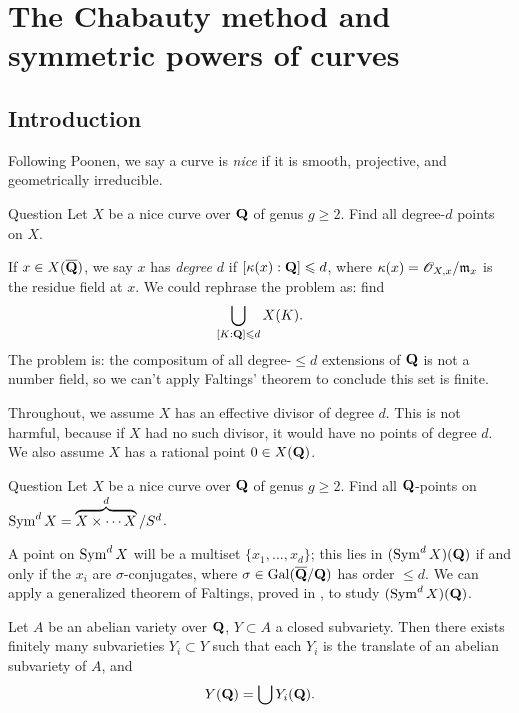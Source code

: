 
\section{The Chabauty method and symmetric powers of curves}





\subsection{Introduction}

Following Poonen, we say a curve is \emph{nice} if it is smooth, projective, 
and geometrically irreducible. 

\begin{enonce}{Question}
Let $X$ be a nice curve over $\mathbf{Q}$ of genus $g\geqslant 2$. Find all degree-$d$ 
points on $X$. 
\end{enonce}

If $x\in X(\overline{\mathbf{Q}})$, we say $x$ has \emph{degree $d$} if 
$[\kappa(x):\mathbf{Q}]\leqslant d$, where $\kappa(x)=\mathscr{O}_{X,x}/\mathfrak{m}_x$ is the residue 
field at $x$. We could rephrase the problem as: find 
\[
  \bigcup_{[K:\mathbf{Q}]\leqslant d} X(K) .
\]
The problem is: the compositum of all degree-$\leqslant d$ extensions of $\mathbf{Q}$ 
is not a number field, so we can't apply Faltings' theorem to conclude this set 
is finite. 

Throughout, we assume $X$ has an effective divisor of degree $d$. This is not 
harmful, because if $X$ had no such divisor, it would have no points of degree 
$d$. We also assume $X$ has a rational point $0\in X(\mathbf{Q})$. 

\begin{enonce}{Question}
Let $X$ be a nice curve over $\mathbf{Q}$ of genus $g\geqslant 2$. Find all 
$\mathbf{Q}$-points on $\operatorname{Sym}^d X = \overbrace{X\times \cdots X}^d / S^d$. 
\end{enonce}

A point on $\operatorname{Sym}^d X$ will be a multiset $\{x_1,\dots,x_d\}$; this lies 
in $(\operatorname{Sym}^d X)(\mathbf{Q})$ if and only if the $x_i$ are $\sigma$-conjugates, 
where $\sigma\in \operatorname{Gal}(\overline{\mathbf{Q}}/\mathbf{Q})$ has order $\leqslant d$. We can 
apply a generalized theorem of Faltings, proved in \cite{f94}, to study 
$(\operatorname{Sym}^d X)(\mathbf{Q})$. 

\begin{theo}[Faltings]
Let $A$ be an abelian variety over $\mathbf{Q}$, $Y\subset A$ a closed subvariety. Then 
there exists finitely many subvarieties $Y_i\subset Y$ such that each $Y_i$ is 
the translate of an abelian subvariety of $A$, and 
\[
  Y(\mathbf{Q}) = \bigcup Y_i(\mathbf{Q}) .
\]
\end{theo}

